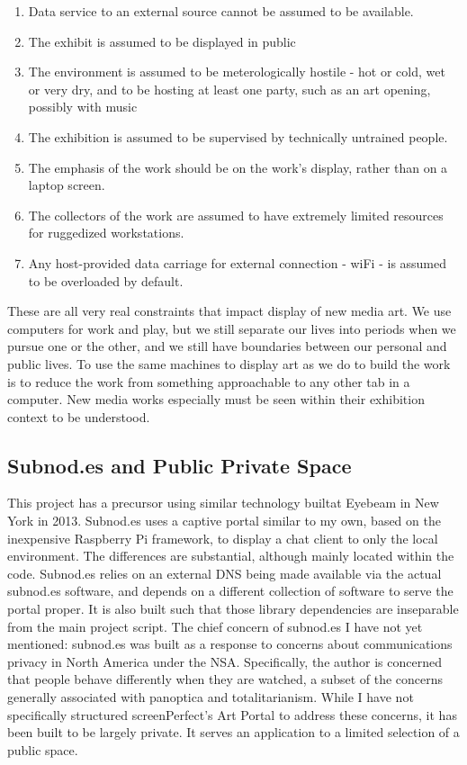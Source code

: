 \begin{enumerate}
\item Data service to an external source cannot be assumed to be available. 
\item The exhibit is assumed to be displayed in public
\item The environment is assumed to be meterologically hostile - hot or cold, wet or very dry, and to be hosting at least one party, such as an art opening, possibly with music
\item The exhibition is assumed to be supervised by technically untrained people.
\item The emphasis of the work should be on the work's display, rather than on a laptop screen.
\item The collectors of the work are assumed to have extremely limited resources for ruggedized workstations.
\item Any host-provided data carriage for external connection - wiFi - is assumed to be overloaded by default.
\end{enumerate}

 These are all very real constraints that impact display of new media art. We use computers for work and play, but we still separate our lives into periods when we pursue one or the other, and we still have boundaries between our personal and public lives. To use the same machines to display art as we do to build the work is to reduce the work from something approachable to any other tab in a computer. New media works especially must be seen within their exhibition context to be understood.

\subsection{Subnod.es and Public Private Space}
This project has a precursor using similar technology builtat Eyebeam in New York in 2013. Subnod.es uses a captive portal similar to my own, based on the inexpensive Raspberry Pi framework, to display a chat client to only the local environment. The differences are substantial, although mainly located within the code. Subnod.es relies on an external DNS being made available via the actual subnod.es software, and depends on a different collection of software to serve the portal proper. It is also built such that those library dependencies are inseparable from the main project script.
The chief concern of subnod.es I have not yet mentioned: subnod.es was built as a response to concerns about communications privacy in North America under the NSA. Specifically, the author is concerned that people behave differently when they are watched, a subset of the concerns generally associated with panoptica and totalitarianism. While I have not specifically structured screenPerfect's Art Portal to address these concerns, it has been built to be largely private. It serves an application to a limited selection of a public space.

